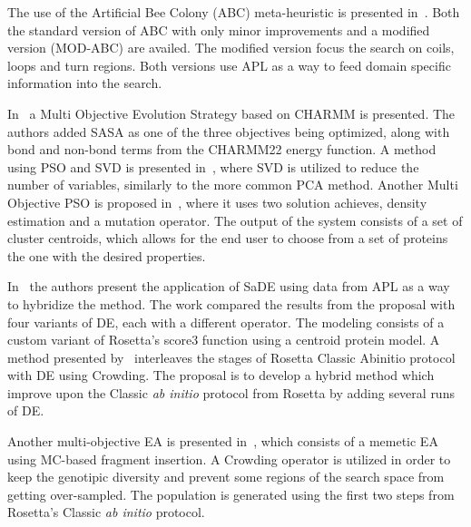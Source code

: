 The use of the Artificial Bee Colony (ABC) meta-heuristic is presented
in~\cite{correa2018knowledge}. Both the standard version of ABC with only
minor improvements and a modified version (MOD-ABC) are availed.
The modified version focus the search on coils, loops and turn regions. Both versions
use \ac{APL} as a way to feed domain specific information into the search.

In~\cite{gao2018incorporation} a Multi Objective Evolution Strategy based on
CHARMM is presented. The authors added \ac{SASA} as one of the three objectives
being optimized, along with bond and non-bond terms from the CHARMM22 energy
function. A method using \ac{PSO} and \ac{SVD} is presented in~\cite{alvarez2018protein},
where \ac{SVD} is utilized to reduce the number of variables, similarly to the
more common \ac{PCA} method. Another Multi Objective \ac{PSO} is proposed
in~\cite{song2018adoption}, where it uses two solution achieves, density estimation
and a mutation operator. The output of the system consists of a set of cluster
centroids, which allows for the end user to choose from a set of proteins the
one with the desired properties.

In~\cite{narloch2019knowledge} the authors present the application of \ac{SaDE}
using data from \ac{APL} as a way to hybridize the method. The work compared the
results from the proposal with four variants of \ac{DE}, each with a different
operator. The modeling consists of a custom variant of Rosetta's score3 function
using a centroid protein model. A method presented by~\cite{varela2019crowding}
interleaves the stages of Rosetta Classic Abinitio protocol with \ac{DE} using
Crowding. The proposal is to develop a hybrid method which improve upon the
Classic \textit{ab initio} protocol from Rosetta by adding several runs of \ac{DE}.

Another multi-objective \ac{EA} is presented in~\cite{zaman2019balancing}, which
consists of a memetic EA using \ac{MC}-based fragment insertion. A Crowding operator
is utilized in order to keep the genotipic diversity and prevent some regions
of the search space from getting over-sampled. The population is generated using
the first two steps from Rosetta's Classic \textit{ab initio} protocol.

